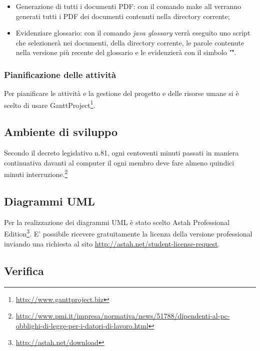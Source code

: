 \begin{itemize}
	\item Generazione di tutti i documenti PDF: con il comando make all verranno generati tutti i PDF dei documenti contenuti nella directory corrente;
	\item Evidenziare glossario: con il comando \textit{java glossary} verrà eseguito uno script che selezionerà nei documenti, della directory corrente, le parole contenute nella versione più recente del glossario e le evidenzierà con il simbolo "\G".

\end{itemize}

\subsubsection{Pianificazione delle attività}
Per pianificare le attività e la gestione del progetto e delle risorse umane si è scelto di usare GanttProject\footnote{\url{http://www.ganttproject.biz}}.

\subsection{Ambiente di sviluppo}
Secondo il decreto legislativo n.81, ogni centoventi minuti passati in maniera continuativa davanti al computer il ogni membro deve fare almeno quindici minuti interruzione.\footnote{\url{http://www.pmi.it/impresa/normativa/news/51788/dipendenti-al-pc-obblighi-di-legge-per-i-datori-di-lavoro.html}}

\subsection{Diagrammi UML}

Per la realizzazione dei diagrammi \gls{UML} è stato scelto \gls{Astah} Professional Edition\footnote{\url{http://astah.net/download}}.
E' possibile ricevere gratuitamente la licenza della versione professional inviando una richiesta al sito \url{http://astah.net/student-license-request}.

\subsection{Verifica}

